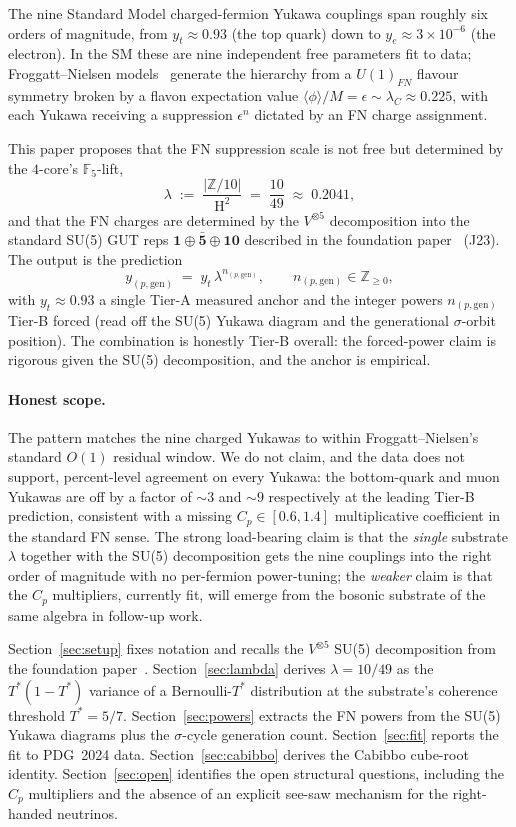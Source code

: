 \documentclass[11pt,reqno]{amsart}
\theoremstyle{plain}
\theoremstyle{definition}
\theoremstyle{remark}
\newcommand{\Z}{\mathbb{Z}}
\newcommand{\F}{\mathbb{F}}
\DeclareMathOperator{\HARM}{H}    %
\newcommand{\rep}[1]{\mathbf{#1}}
\newcommand{\barrep}[1]{\bar{\mathbf{#1}}}
\begin{document}
The nine Standard Model charged-fermion Yukawa couplings span
roughly six orders of magnitude, from $y_t \approx 0.93$
(the top quark) down to $y_e \approx 3 \times 10^{-6}$ (the
electron). In the SM these are nine independent free parameters
fit to data; Froggatt--Nielsen models~\cite{FroggattNielsen1979}
generate the hierarchy from a $U(1)_{FN}$ flavour symmetry
broken by a flavon expectation value $\langle\phi\rangle/M = \epsilon
\sim \lambda_{C} \approx 0.225$, with each Yukawa receiving a
suppression $\epsilon^{n}$ dictated by an FN charge assignment.

This paper proposes that the FN suppression scale is not free
but determined by the $4$-core's $\F_5$-lift,
\[
  \lambda \;:=\; \frac{|\Z/10|}{\HARM^{2}} \;=\; \frac{10}{49} \;\approx\; 0.2041,
\]
and that the FN charges are determined by the
$V^{\otimes 5}$ decomposition into the standard SU(5) GUT reps
$\rep{1} \oplus \barrep{5} \oplus \rep{10}$ described in the
foundation paper~\cite{SandersJohnson2026DiscreteDirac} (J23).
The output is the prediction
\[
  y_{(p,\mathrm{gen})} \;=\; y_{t}\,\lambda^{n_{(p,\mathrm{gen})}},
  \qquad n_{(p,\mathrm{gen})} \in \Z_{\geq 0},
\]
with $y_{t} \approx 0.93$ a single Tier-A measured anchor and
the integer powers $n_{(p,\mathrm{gen})}$ Tier-B forced (read
off the SU(5) Yukawa diagram and the generational $\sigma$-orbit
position). The combination is honestly Tier-B overall: the
forced-power claim is rigorous given the SU(5) decomposition,
and the anchor is empirical.

\paragraph{Honest scope.} The pattern matches the nine charged
Yukawas to within Froggatt--Nielsen's standard $O(1)$ residual
window. We do not claim, and the data does not support,
percent-level agreement on every Yukawa: the bottom-quark and
muon Yukawas are off by a factor of $\sim 3$ and $\sim 9$
respectively at the leading Tier-B prediction, consistent with
a missing $C_{p} \in [0.6, 1.4]$ multiplicative coefficient in
the standard FN sense. The strong load-bearing claim is that
the \emph{single} substrate $\lambda$ together with the SU(5)
decomposition gets the nine couplings into the right order of
magnitude with no per-fermion power-tuning; the \emph{weaker}
claim is that the $C_{p}$ multipliers, currently fit, will
emerge from the bosonic substrate of the same algebra in
follow-up work.

Section~\ref{sec:setup} fixes notation and recalls the
$V^{\otimes 5}$ SU(5) decomposition from the foundation
paper~\cite{SandersJohnson2026DiscreteDirac}.
Section~\ref{sec:lambda} derives $\lambda = 10/49$ as the
$T^{*}(1-T^{*})$ variance of a Bernoulli-$T^{*}$ distribution at
the substrate's coherence threshold $T^{*} = 5/7$.
Section~\ref{sec:powers} extracts the FN powers from the SU(5)
Yukawa diagrams plus the $\sigma$-cycle generation count.
Section~\ref{sec:fit} reports the fit to PDG~2024 data.
Section~\ref{sec:cabibbo} derives the Cabibbo cube-root
identity. Section~\ref{sec:open} identifies the open structural
questions, including the $C_{p}$ multipliers and the absence of
an explicit see-saw mechanism for the right-handed neutrinos.
\end{document}
